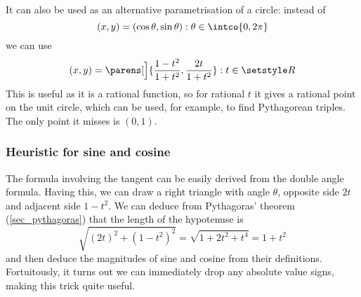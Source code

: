 It can also be used as an alternative parametrisation of a circle: instead
of
\begin{equation*}
 (x, y) = (\cos\theta, \sin\theta): \theta \in \intco{0, 2\pi}
\end{equation*}
we can use
\begin{equation*}
 (x, y) = \parens[\Big]{\frac{1 - t^2}{1 + t^2}, \frac{2t}{1 + t^2}}: t \in \Reals
\end{equation*}
This is useful as it is a rational function, so for rational \(t\) it gives
a rational point on the unit circle, which can be used, for example, to find
Pythagorean triples. The only point it misses is \((0, 1)\).

\subsubsection{Heuristic for sine and cosine}


The formula involving the tangent can be easily derived from the double
angle formula. Having this, we can draw a right triangle with angle
\(\theta\), opposite side \(2t\) and adjacent side \(1 - t^2\). We can
deduce from Pythagoras' theorem (\ref{sec_pythagoras}) that the length of
the hypotenuse is
\begin{equation*}
 \sqrt{(2t)^2 + (1 - t^2)^2} = \sqrt{1 + 2t^2 + t^4} = 1 + t^2
\end{equation*}
and then deduce the magnitudes of sine and cosine from their definitions.
Fortuitously, it turns out we can immediately drop any absolute value
signs, making this trick quite useful.

